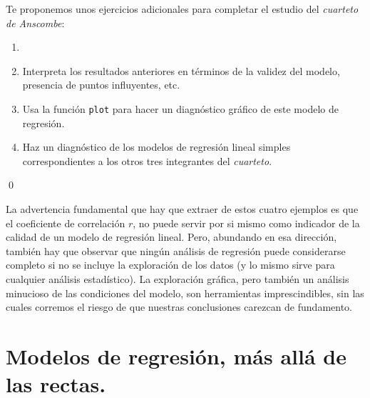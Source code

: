 \documentclass[10pt,a4paper]{article}\usepackage[]{graphicx}\usepackage[]{color}
\begin{document}
Te proponemos unos ejercicios adicionales para completar el estudio del {\em cuarteto de Anscombe}:
\begin{ejercicio}
\label{tut10:ejercicio08}
\begin{enumerate}
  \item[]
  \item Interpreta los resultados anteriores en términos de la validez del modelo, presencia de puntos influyentes, etc.
  \item Usa la función {\tt plot} para hacer un diagnóstico gráfico de este modelo de regresión.

  \item Haz un diagnóstico de los modelos de regresión lineal simples correspondientes a los otros tres integrantes del {\em cuarteto}.
\end{enumerate}
\qed
\end{ejercicio}

La advertencia fundamental que hay que extraer de estos cuatro ejemplos es que el coeficiente de correlación $r$, no puede servir por si mismo como indicador de la calidad de un modelo de regresión lineal. Pero, abundando en esa dirección, también hay que observar que ningún análisis de regresión puede considerarse completo si no se incluye la exploración de los datos (y lo mismo sirve para cualquier análisis estadístico). La exploración gráfica, pero también un análisis minucioso de las condiciones del modelo, son herramientas imprescindibles, sin las cuales corremos el riesgo de que nuestras conclusiones carezcan de fundamento.



\section{Modelos de regresión, más allá de las rectas.}
\end{document}

